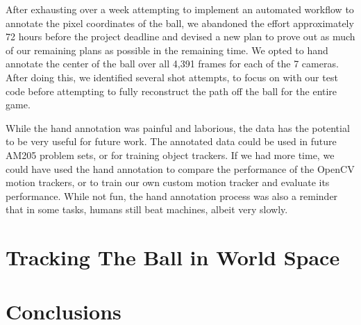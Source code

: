 \documentclass{article}
\begin{document}
After exhausting over a week attempting to implement an automated workflow to 
annotate the pixel coordinates of the ball, we abandoned the effort approximately
72 hours before the project deadline and devised a new plan to prove out as much
of our remaining plans as possible in the remaining time.
We opted to hand annotate the center of the ball over all 4,391 frames for each of the 7 cameras.
After doing this, we identified several shot attempts, to focus on with our test code before attempting to fully reconstruct the path off the ball for the entire game.

While the hand annotation was painful and laborious, the data has the potential to be very useful for future work. 
The annotated data could be used in future AM205 problem sets, or for training object trackers. 
If we had more time, we could have used the hand annotation to compare the performance of the OpenCV motion trackers, 
or to train our own custom motion tracker and evaluate its performance. 
While not fun, the hand annotation process was also a reminder that in some tasks, humans still beat machines, albeit very slowly.


\newpage
\section{Tracking The Ball in World Space}

\newpage
\section{Conclusions}
\end{document}
